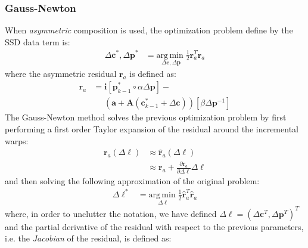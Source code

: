 \subsubsection{Gauss-Newton}
\label{sec:gauss_newton}

When \emph{asymmetric} composition is used, the optimization problem define by the SSD data term is:
\begin{equation}
    \begin{aligned}
        \Delta \mathbf{c}^*, \Delta \mathbf{p}^* & = \underset{\Delta \mathbf{c}, \Delta \mathbf{p}}{\mathrm{arg\,min\;}} \frac{1}{2} \mathbf{r}_a^T\mathbf{r}_a
    \label{eq:asymmetric_ssd}
    \end{aligned}
\end{equation}
where the asymmetric residual $\mathbf{r}_a$ is defined as:
\begin{equation}
    \begin{aligned}
		\mathbf{r}_a & = \mathbf{i}[\mathbf{p}_{k-1}^* \circ \alpha \Delta \mathbf{p}] -
		\\
		& \quad \, \, (\mathbf{a} + \mathbf{A}(\mathbf{c}^*_{k-1} + \Delta\mathbf{c})) [\beta \Delta \mathbf{p}^{-1}]
    \label{eq:asymmetric_residual}
    \end{aligned}
\end{equation}
The Gauss-Newton method solves the previous optimization problem by first performing a first order Taylor expansion of the residual around the incremental warps:
\begin{equation}
    \begin{aligned}
		\mathbf{r}_a(\Delta \boldsymbol{\ell}) & \approx \hat{\mathbf{r}}_a(\Delta \boldsymbol{\ell})
		\\
		& \approx \mathbf{r}_a + \frac{\partial \mathbf{r}_a}{\partial \Delta \boldsymbol{\ell}} \Delta \boldsymbol{\ell}
    \label{eq:asymmetric_residual_taylor}
    \end{aligned}
\end{equation}
and then solving the following approximation of the original problem:
\begin{equation}
    \begin{aligned}
        \Delta \boldsymbol{\ell}^* & = \underset{\Delta \boldsymbol{\ell}}{\mathrm{arg\,min\;}} \frac{1}{2} \hat{\mathbf{r}}_a^T\hat{\mathbf{r}}_a
    \label{eq:asymmetric_ssd_taylor}
    \end{aligned}
\end{equation}
where, in order to unclutter the notation, we have defined $\Delta \boldsymbol{\ell} = (\Delta \mathbf{c}^T, \Delta \mathbf{p}^T)^T$ and the partial derivative of the residual with respect to the previous parameters, i.e. the \emph{Jacobian} of the residual, is defined as:
